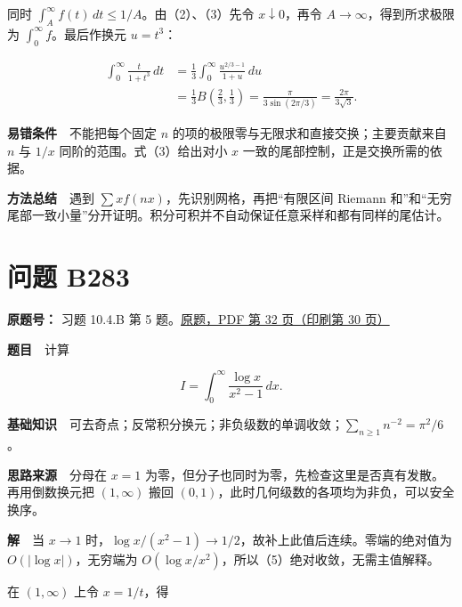 \documentclass[11pt,a4paper]{article}
\begin{document}
同时 \(\int_A^\infty f(t)\,dt\le1/A\)。由（2）、（3）先令
\(x\downarrow0\)，再令 \(A\to\infty\)，得到所求极限为
\(\int_0^\infty f\)。最后作换元 \(u=t^3\)：

\begin{equation}
\begin{aligned}
\int_0^\infty\frac{t}{1+t^3}\,dt
&=\frac13\int_0^\infty\frac{u^{2/3-1}}{1+u}\,du\\
&=\frac13 B\left(\frac23,\frac13\right)
=\frac{\pi}{3\sin(2\pi/3)}
=\frac{2\pi}{3\sqrt3}.
\end{aligned}
\tag{4}
\end{equation}

\textbf{易错条件}　不能把每个固定 \(n\)
的项的极限零与无限求和直接交换；主要贡献来自 \(n\) 与 \(1/x\)
同阶的范围。式（3）给出对小 \(x\) 一致的尾部控制，正是交换所需的依据。

\textbf{方法总结}　遇到 \(\sum x f(nx)\)，先识别网格，再把``有限区间
Riemann
和''和``无穷尾部一致小量''分开证明。积分可积并不自动保证任意采样和都有同样的尾估计。

\section{问题 B283}\label{ux95eeux9898-b283}

\textbf{原题号：} 习题 10.4.B 第 5
题。\href{https://zj139.github.io/math-notes/files/problems/楼分析习题-v2.pdf\#page=32}{原题，PDF
第 32 页（印刷第 30 页）}

\textbf{题目}　计算

\begin{equation}
I=\int_0^\infty\frac{\log x}{x^2-1}\,dx.
\tag{5}
\end{equation}

\textbf{基础知识}　可去奇点；反常积分换元；非负级数的单调收敛；\(\sum_{n\ge1}n^{-2}=\pi^2/6\)。

\textbf{思路来源}　分母在 \(x=1\)
为零，但分子也同时为零，先检查这里是否真有发散。再用倒数换元把
\((1,\infty)\) 搬回
\((0,1)\)，此时几何级数的各项均为非负，可以安全换序。

\textbf{解}　当 \(x\to1\)
时，\(\log x/(x^2-1)\to1/2\)，故补上此值后连续。零端的绝对值为
\(O(|\log x|)\)，无穷端为
\(O(\log x/x^2)\)，所以（5）绝对收敛，无需主值解释。

在 \((1,\infty)\) 上令 \(x=1/t\)，得
\end{document}
